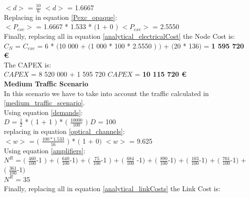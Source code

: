 $<d>$ = $\frac{10}{6}$ \qquad \qquad $<d>$ = 1.6667\\

Replacing in equation \ref{Pexc_opaque}:\\

$<P_{exc}>$ = 1.6667 * 1.533 * $($1 + $0$ $)$ \qquad \qquad $<P_{exc}>$ = 2.5550 \\

Finally, replacing all in equation \ref{analytical_electricalCost} the Node Cost is:\\

$C_N$ = $C_{exc}$ = 6 * $($10 000 + $($1 000 * 100 * 2.5550 $)$ $)$ + $($20 * 136$)$ = \textbf{1 595 720 \euro}\\

The CAPEX is:\\

$CAPEX$ = 8 520 000 + 1 595 720 \qquad \qquad $CAPEX$ = \textbf{10 115 720 \euro}\\

\textbf{Medium Traffic Scenario}\\

In this scenario we have to take into account the traffic calculated in \ref{medium_traffic_scenario}.\\

Using equation \ref{demands}:\\

$D$ = $\frac{1}{2}$ * $($ 1 + 1 $)$ * $($ $\frac{10 000}{100}$ $)$ \qquad \qquad $D$ = 100\\

replacing in equation \ref{optical_channels}:\\

$<w>$ = $($ $\frac{100 * 1.533}{16}$ $)$ * $($ 1 + 0$)$ \qquad \quad $<w>$ = 9.625\\

Using equation \ref{amplifiers}:\\

$N^R$ = $($ $\frac{460}{100}$-1 $)$ + $($ $\frac{640}{100}$-1$)$ + $($ $\frac{75}{100}$-1 $)$ + $($ $\frac{684}{100}$ -1$)$ + $($ $\frac{890}{100}$-1$)$ + $($ $\frac{103}{100}$-1$)$ + $($ $\frac{761}{100}$-1$)$ + $($ $\frac{361}{100}$-1$)$\\

$N^R$ = 35\\

Finally, replacing all in equation \ref{analytical_linkCosts} the Link Cost is:\\

